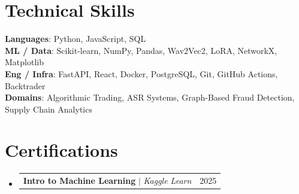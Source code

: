 \documentclass[letterpaper,10.5pt]{article}
\makeatletter
\newcommand{\resumeProjectHeading}[2]{
    \item
    \begin{tabular*}{0.97\textwidth}{l@{\extracolsep{\fill}}r}
      \small#1 & #2 \\
    \end{tabular*}\vspace{-7pt}
}
\newcommand{\resumeSubHeadingListStart}{\begin{itemize}[leftmargin=0.15in, label={}]}
\newcommand{\resumeSubHeadingListEnd}{\end{itemize}}
\makeatother
\begin{document}
\section{Technical Skills}
\begin{itemize}[leftmargin=0.15in, label={}]
  \small{\item{
    \textbf{Languages}{: Python, JavaScript, SQL} \\
    \textbf{ML / Data}{: Scikit-learn, NumPy, Pandas, Wav2Vec2, LoRA, NetworkX, Matplotlib} \\
    \textbf{Eng / Infra}{: FastAPI, React, Docker, PostgreSQL, Git, GitHub Actions, Backtrader} \\
    \textbf{Domains}{: Algorithmic Trading, ASR Systems, Graph-Based Fraud Detection, Supply Chain Analytics}
  }}
\end{itemize}

\section{Certifications}
\resumeSubHeadingListStart
  \resumeProjectHeading
    {\textbf{Intro to Machine Learning} $|$ \emph{Kaggle Learn}}{2025}
\resumeSubHeadingListEnd

\end{document}
